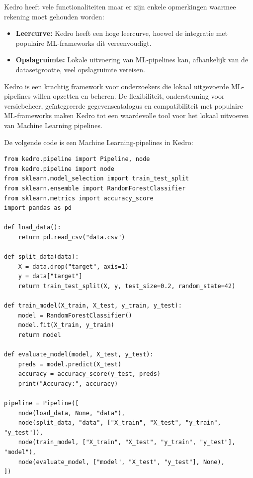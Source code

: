 Kedro heeft vele functionaliteiten maar er zijn enkele opmerkingen waarmee rekening moet gehouden worden:

\begin{itemize}
    \item \textbf{Leercurve:} Kedro heeft een hoge leercurve, hoewel de integratie met populaire ML-frameworks dit vereenvoudigt.
    \item \textbf{Opslagruimte:} Lokale uitvoering van ML-pipelines kan, afhankelijk van de datasetgrootte, veel opslagruimte vereisen.
\end{itemize}

Kedro is een krachtig framework voor onderzoekers die lokaal uitgevoerde ML-pipelines willen opzetten en beheren. De flexibiliteit, ondersteuning voor versiebeheer, geïntegreerde gegevenscatalogus en compatibiliteit met populaire ML-frameworks maken Kedro tot een waardevolle tool voor het lokaal uitvoeren van Machine Learning pipelines.

De volgende code is een Machine Learning-pipelines in Kedro: 

\begin{verbatim}
from kedro.pipeline import Pipeline, node
from kedro.pipeline import node
from sklearn.model_selection import train_test_split
from sklearn.ensemble import RandomForestClassifier
from sklearn.metrics import accuracy_score
import pandas as pd

def load_data():
    return pd.read_csv("data.csv")

def split_data(data):
    X = data.drop("target", axis=1)
    y = data["target"]
    return train_test_split(X, y, test_size=0.2, random_state=42)

def train_model(X_train, X_test, y_train, y_test):
    model = RandomForestClassifier()
    model.fit(X_train, y_train)
    return model

def evaluate_model(model, X_test, y_test):
    preds = model.predict(X_test)
    accuracy = accuracy_score(y_test, preds)
    print("Accuracy:", accuracy)

pipeline = Pipeline([
    node(load_data, None, "data"),
    node(split_data, "data", ["X_train", "X_test", "y_train", "y_test"]),
    node(train_model, ["X_train", "X_test", "y_train", "y_test"], "model"),
    node(evaluate_model, ["model", "X_test", "y_test"], None),
])

\end{verbatim}
